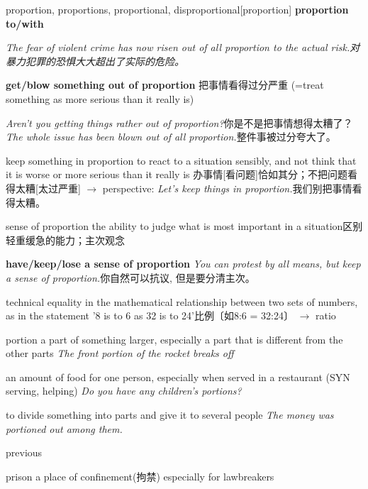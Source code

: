 \begin{DefWord}{proportion, proportions, proportional, disproportional}[proportion]
\textbf{proportion to/with}

\textit{The fear of violent crime has now risen out of all proportion to the actual risk.对暴力犯罪的恐惧大大超出了实际的危险。 }

\textbf{get/blow something out of proportion} 把事情看得过分严重
(=treat something as more serious than it really is)

\textit{Aren't you getting things rather out of proportion?}你是不是把事情想得太糟了？
\textit{The whole issue has been blown out of all proportion.}整件事被过分夸大了。 

keep something in proportion to react to a situation sensibly, and not think that it is worse or more serious than it really is 办事情[看问题]恰如其分；不把问题看得太糟[太过严重] $\rightarrow$ perspective:
\textit{Let's keep things in proportion.}我们别把事情看得太糟。 

sense of proportion the ability to judge what is most important in a situation区别轻重缓急的能力；主次观念

\textbf{have/keep/lose a sense of proportion}
\textit{You can protest by all means, but keep a sense of proportion.}你自然可以抗议, 但是要分清主次。 

technical equality in the mathematical relationship between two sets of numbers, as in the statement '8 is to 6 as 32 is to 24'比例〔如8:6 = 32:24〕 $\rightarrow$ ratio


\end{DefWord}



\begin{DefWord}{portion}
    a part of something larger, especially a part that is different from the other parts
    \textit{The front portion of the rocket breaks off}

    an amount of food for one person, especially when served in a restaurant (SYN  serving, helping)
    \textit{Do you have any children's portions?}

    to divide something into parts and give it to several people
    \textit{The money was portioned out among them.}
\end{DefWord}

\begin{DefWord}{previous}
\end{DefWord}

\begin{DefWord}{prison}
    a place of confinement(拘禁) especially for lawbreakers
\end{DefWord}

